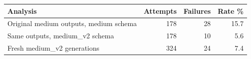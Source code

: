 \begin{tabular}{lrrr}
\toprule
Analysis & Attempts & Failures & Rate \% \\
\midrule
Original medium outputs, medium schema & 178 & 28 & 15.7 \\
Same outputs, medium\_v2 schema & 178 & 10 & 5.6 \\
Fresh medium\_v2 generations & 324 & 24 & 7.4 \\
\bottomrule
\end{tabular}
